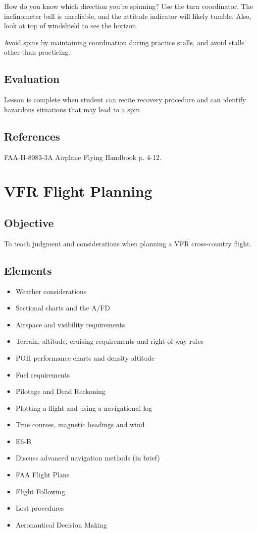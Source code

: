 \documentclass[twoside,openright]{report}
\begin{document}
How do you know which direction you're spinning? Use the turn coordinator. The
inclinometer ball is unreliable, and the attitude indicator will likely tumble.
Also, look at top of windshield to see the horizon.

Avoid spins by maintaining coordination during practice stalls, and avoid
stalls other than practicing.

\section{Evaluation}

Lesson is complete when student can recite recovery procedure and can identify
hazardous situations that may lead to a spin.

\section{References}

FAA-H-8083-3A Airplane Flying Handbook p. 4-12.

\chapter{VFR Flight Planning}

\section{Objective}

To teach judgment and considerations when planning a VFR cross-country flight.

\section{Elements}

\begin{itemize}
  \item Weather considerations
  \item Sectional charts and the A/FD
  \item Airspace and visibility requirements
  \item Terrain, altitude, cruising requirements and right-of-way rules
  \item POH performance charts and density altitude
  \item Fuel requirements
  \item Pilotage and Dead Reckoning
  \item Plotting a flight and using a navigational log
  \item True courses, magnetic headings and wind
  \item E6-B
  \item Discuss advanced navigation methods (in brief)
  \item FAA Flight Plans
  \item Flight Following
  \item Lost procedures
  \item Aeronautical Decision Making
\end{itemize}
\end{document}
